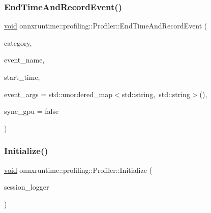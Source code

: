 \subsubsection{\texorpdfstring{End\+Time\+And\+Record\+Event()}{EndTimeAndRecordEvent()}}
{\footnotesize\ttfamily \mbox{\hyperlink{mlasi_8h_a88f941d423cb2a819b70a1358982b1a6}{void}} onnxruntime\+::profiling\+::\+Profiler\+::\+End\+Time\+And\+Record\+Event (\begin{DoxyParamCaption}\item[{\mbox{\hyperlink{namespaceonnxruntime_1_1profiling_acbb1d7474c26b32c5bfef2ce1ab63734}{Event\+Category}}}]{category,  }\item[{const std\+::string \&}]{event\+\_\+name,  }\item[{\mbox{\hyperlink{namespaceonnxruntime_a9b5a17a572f7c3cf77f4892542bd7153}{Time\+Point}} \&}]{start\+\_\+time,  }\item[{std\+::unordered\+\_\+map$<$ std\+::string, std\+::string $>$ \&\&}]{event\+\_\+args = {\ttfamily std\+:\+:unordered\+\_\+map$<$std\+:\+:string,~std\+:\+:string$>$()},  }\item[{bool}]{sync\+\_\+gpu = {\ttfamily false} }\end{DoxyParamCaption})}

\mbox{\label{classonnxruntime_1_1profiling_1_1Profiler_a7b28c8b018d08e70aac7b5ef322c08cb}} 
\subsubsection{\texorpdfstring{Initialize()}{Initialize()}}
{\footnotesize\ttfamily \mbox{\hyperlink{mlasi_8h_a88f941d423cb2a819b70a1358982b1a6}{void}} onnxruntime\+::profiling\+::\+Profiler\+::\+Initialize (\begin{DoxyParamCaption}\item[{const \mbox{\hyperlink{classonnxruntime_1_1logging_1_1Logger}{logging\+::\+Logger}} $\ast$}]{session\+\_\+logger }\end{DoxyParamCaption})}

\mbox{\label{classonnxruntime_1_1profiling_1_1Profiler_ad4289ee2fe6bc266a8ce5322f03ec2e2}} 

